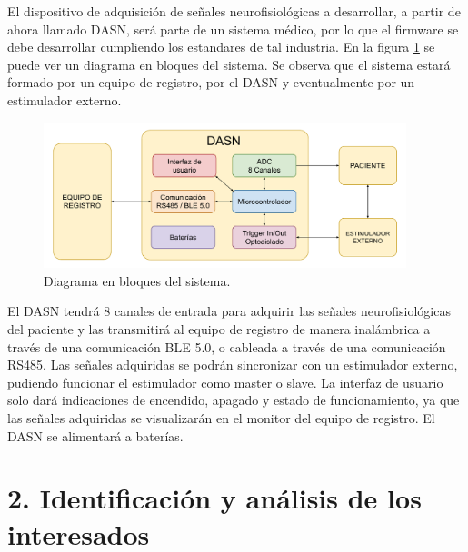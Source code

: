 \documentclass[
11pt, %
codirector, %
]{charter}
\begin{document}
El dispositivo de adquisición de señales neurofisiológicas a desarrollar, a partir de ahora llamado DASN, será parte de un sistema médico, por lo que el firmware se debe desarrollar cumpliendo los estandares de tal industria. En la figura \ref{fig:diagBloquesSistema} se puede ver un diagrama en bloques del sistema. Se observa que el sistema estará formado por un equipo de registro, por el DASN y eventualmente por un estimulador externo. 

\begin{figure}[htpb]
\centering 
\includegraphics[width=0.94\textwidth]{./Figuras/DiagramaEnBloquesDASN.pdf}
\caption{Diagrama en bloques del sistema.}
\label{fig:diagBloquesSistema}
\end{figure}

El DASN tendrá 8 canales de entrada para adquirir las señales neurofisiológicas del paciente y las transmitirá al equipo de registro de manera inalámbrica a través de una comunicación BLE 5.0, o cableada a través de una comunicación RS485. Las señales adquiridas se podrán sincronizar con un estimulador externo, pudiendo funcionar el estimulador como master o slave. La interfaz de usuario solo dará indicaciones de encendido, apagado y estado de funcionamiento, ya que las señales adquiridas se visualizarán en el monitor del equipo de registro. El DASN se alimentará a baterías.

\section{2. Identificación y análisis de los interesados}
\label{sec:interesados}
\end{document}
